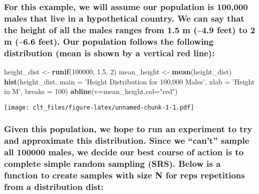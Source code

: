 \documentclass[
]{article}
\newenvironment{Shaded}{\begin{snugshade}}{\end{snugshade}}
\newcommand{\DataTypeTok}[1]{\textcolor[rgb]{0.13,0.29,0.53}{#1}}
\newcommand{\DecValTok}[1]{\textcolor[rgb]{0.00,0.00,0.81}{#1}}
\newcommand{\FloatTok}[1]{\textcolor[rgb]{0.00,0.00,0.81}{#1}}
\newcommand{\KeywordTok}[1]{\textcolor[rgb]{0.13,0.29,0.53}{\textbf{#1}}}
\newcommand{\NormalTok}[1]{#1}
\newcommand{\StringTok}[1]{\textcolor[rgb]{0.31,0.60,0.02}{#1}}
\begin{document}
\hypertarget{for-this-example-we-will-assume-our-population-is-100000-males-that-live-in-a-hypothetical-country.-we-can-say-that-the-height-of-all-the-males-ranges-from-1.5-m-4.9-feet-to-2-m-6.6-feet.-our-population-follows-the-following-distribution-mean-is-shown-by-a-vertical-red-line}{%
\subsubsection{For this example, we will assume our population is
100,000 males that live in a hypothetical country. We can say that the
height of all the males ranges from 1.5 m (\textasciitilde4.9 feet) to 2
m (\textasciitilde6.6 feet). Our population follows the following
distribution (mean is shown by a vertical red
line):}\label{for-this-example-we-will-assume-our-population-is-100000-males-that-live-in-a-hypothetical-country.-we-can-say-that-the-height-of-all-the-males-ranges-from-1.5-m-4.9-feet-to-2-m-6.6-feet.-our-population-follows-the-following-distribution-mean-is-shown-by-a-vertical-red-line}}

\begin{Shaded}
\begin{Highlighting}[]
\NormalTok{height_dist <-}\StringTok{ }\KeywordTok{runif}\NormalTok{(}\DecValTok{100000}\NormalTok{, }\FloatTok{1.5}\NormalTok{, }\DecValTok{2}\NormalTok{)}
\NormalTok{mean_height <-}\StringTok{ }\KeywordTok{mean}\NormalTok{(height_dist)}
\KeywordTok{hist}\NormalTok{(height_dist, }
     \DataTypeTok{main =} \StringTok{'Height Distribution for 100,000 Males'}\NormalTok{,}
     \DataTypeTok{xlab =} \StringTok{'Height in M'}\NormalTok{,}
     \DataTypeTok{breaks =} \DecValTok{100}\NormalTok{)}
\KeywordTok{abline}\NormalTok{(}\DataTypeTok{v=}\NormalTok{mean_height,}\DataTypeTok{col=}\StringTok{"red"}\NormalTok{)}
\end{Highlighting}
\end{Shaded}

\texttt{[image: clt\_files/figure-latex/unnamed-chunk-1-1.pdf]}

\hypertarget{given-this-population-we-hope-to-run-an-experiment-to-try-and-approximate-this-distribution.-since-we-cant-sample-all-100000-males-we-decide-our-best-course-of-action-is-to-complete-simple-random-sampling-srs.-below-is-a-function-to-create-samples-with-size-n-for-reps-repetitions-from-a-distribution-dist}{%
\subsubsection{Given this population, we hope to run an experiment to
try and approximate this distribution. Since we ``can't'' sample all
100000 males, we decide our best course of action is to complete simple
random sampling (SRS). Below is a function to create samples with size N
for reps repetitions from a distribution
dist:}\label{given-this-population-we-hope-to-run-an-experiment-to-try-and-approximate-this-distribution.-since-we-cant-sample-all-100000-males-we-decide-our-best-course-of-action-is-to-complete-simple-random-sampling-srs.-below-is-a-function-to-create-samples-with-size-n-for-reps-repetitions-from-a-distribution-dist}}
\end{document}
